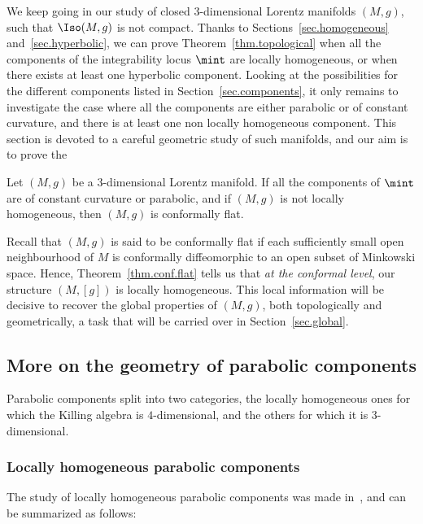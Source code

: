 We keep going in our study of closed $3$-dimensional Lorentz manifolds $(M,g)$, such that $\Iso(M,g)$ is not compact. Thanks to Sections~\ref{sec.homogeneous} and~\ref{sec.hyperbolic}, we can prove Theorem~\ref{thm.topological} when all the components of the integrability locus $\mint$ are locally homogeneous, or when there exists at least one hyperbolic component. Looking at the possibilities for the different components listed in Section~\ref{sec.components}, it only remains to investigate the case where all the components are either parabolic or of constant curvature, and there is at least one non locally homogeneous component. This section is devoted to a careful geometric study of such manifolds, and our aim is to prove the


\begin{theo}\label{thm.conf.flat}
Let $(M,g)$ be a $3$-dimensional Lorentz manifold. If all the components of $\mint$ are of constant curvature or parabolic, and if $(M,g)$ is not locally homogeneous, then $(M,g)$ is conformally flat.
\end{theo}


Recall that $(M,g)$ is said to be conformally flat if each sufficiently small open neighbourhood of $M$ is conformally diffeomorphic to an open subset of Minkowski space. Hence, Theorem~\ref{thm.conf.flat} tells us that \emph{at the conformal level}, our structure $(M,[g])$ is locally homogeneous. This local information will be decisive to recover the global properties of $(M,g)$, both topologically and geometrically, a task that will be carried over in Section~\ref{sec.global}.



\subsection{More on the geometry of parabolic components}
Parabolic components split into two categories, the locally homogeneous ones for which the Killing algebra is $4$-dimensional, and the others for which it is $3$-dimensional.

\subsubsection{Locally homogeneous parabolic components}\label{sec.lochomoparabolic}
The study of locally homogeneous parabolic components was made in~\cite{frances.open}, and can be summarized as follows:

